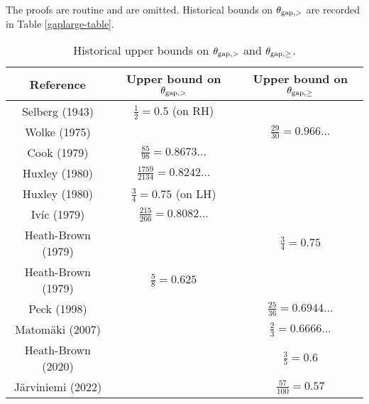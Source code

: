 The proofs are routine and are omitted.  Historical bounds on $\theta_{\mathrm{gap},>}$ are recorded in Table \ref{gaplarge-table}.

\begin{table}[ht]
    \caption{Historical upper bounds on $\theta_{\mathrm{gap},>}$ and $\theta_{\mathrm{gap},\geq}$.}
    \centering
    \renewcommand{\arraystretch}{1.2}
    \begin{tabular}{|c|c|c|}
    \hline
    Reference & Upper bound on $\theta_{\mathrm{gap},>}$ & Upper bound on $\theta_{\mathrm{gap},\geq}$\\
    \hline
    Selberg (1943) \cite{selberg_1943} & $\frac{1}{2}=0.5$ (on RH) & \\
    \hline
    Wolke (1975) \cite{wolke_1975} & & $\frac{29}{30} = 0.966\dots$ \\
    \hline
    Cook (1979) \cite{cook_1979} & $\frac{85}{98} = 0.8673\dots$ & \\
    \hline
    Huxley (1980) \cite{huxley_large_1980} & $\frac{1759}{2134} = 0.8242\dots$ & \\
    \hline
    Huxley (1980) \cite{huxley_large_1980} & $\frac{3}{4} = 0.75$ (on LH) & \\
    \hline
    Iv\'ic (1979) \cite{ivic_sums_1979} & $\frac{215}{266} = 0.8082\dots$ & \\
    \hline
    Heath-Brown (1979) \cite{heath_brown_consecutive_III} & & $\frac{3}{4} = 0.75$ \\
    \hline
    Heath-Brown (1979) \cite{heath_brown_consecutive_II} & $\frac{5}{8} = 0.625$ & \\
    \hline
    Peck (1998) \cite{peck_differences_1998} & & $\frac{25}{36} = 0.6944\ldots$ \\
    \hline
    Matom\"{a}ki (2007) \cite{matomaki_large_2007} & & $\frac{2}{3} = 0.6666\ldots$ \\
    \hline
    Heath-Brown (2020) \cite{heath-brown_differences_2021} & & $\frac{3}{5} = 0.6$\\
    \hline 
    J\"{a}rviniemi (2022) \cite{jarviniemi_large_2022} & & $\frac{57}{100} = 0.57$\\
    \hline
    \end{tabular}
\end{table}\label{gaplarge-table}
